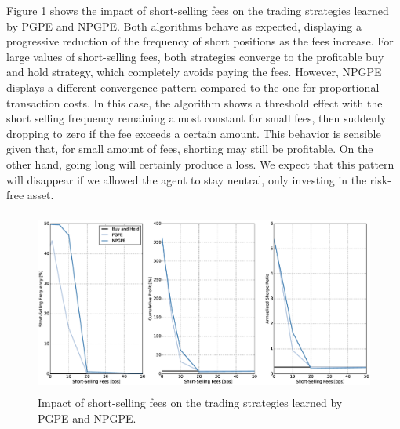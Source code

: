 Figure \ref{fig:impact_short_selling_fees} shows the impact of short-selling fees on the trading strategies learned by \gls{PGPE} and \gls{NPGPE}. Both algorithms behave as expected, displaying a progressive reduction of the frequency of short positions as the fees increase. For large values of short-selling fees, both strategies converge to the profitable buy and hold strategy, which completely avoids paying the fees. However, \gls{NPGPE} displays a different convergence pattern compared to the one for proportional transaction costs. In this case, the algorithm shows a threshold effect with the short selling frequency remaining almost constant for small fees, then suddenly dropping to zero if the fee exceeds a certain amount. This behavior is sensible given that, for small amount of fees, shorting may still be profitable. On the other hand, going long will certainly produce a loss. We expect that this pattern will disappear if we allowed the agent to stay neutral, only investing in the risk-free asset. \begin{figure}[t!]
	\centering
	\includegraphics[height=6cm,width=1.0\textwidth]{Images/6_3_impact_short_selling_fees}
	\caption[Short-selling fees and risk-neutral strategies.]{Impact of short-selling fees on the trading strategies learned by PGPE and NPGPE.}
	\label{fig:impact_short_selling_fees}
\end{figure}


